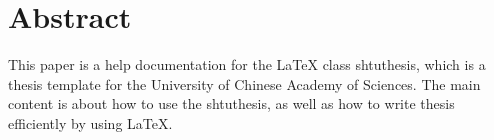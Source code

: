 \maketitle%
\MAKETITLE%
\makedeclaration%
%
%
\intobmk\chapter*{Abstract}%

This paper is a help documentation for the \LaTeX{} class shtuthesis, which is  a thesis template for the University of Chinese Academy of Sciences. The main content is about how to use the shtuthesis, as well as how to write thesis efficiently by using \LaTeX{}.

